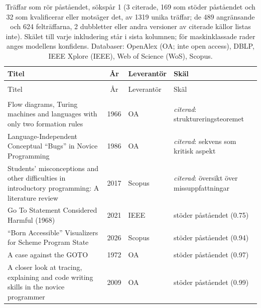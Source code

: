 
\begingroup\footnotesize
\begin{longtable}{@{}%
  >{\raggedright\arraybackslash}p{}c%
  >{\raggedright\arraybackslash}p{}%
  >{\raggedright\arraybackslash}p{}@{}}
\caption{Träffar som rör påståendet, sökspår 1 (3 citerade, 169 som stöder påståendet och 32 som kvalificerar eller motsäger det, av 1319 unika träffar; de 489 angränsande och 624 felträffarna, 2 dubbletter eller andra versioner av citerade källor listas inte). Skälet till varje inkludering står i sista kolumnen; för maskinklassade rader anges modellens konfidens. Databaser: OpenAlex (OA; inte open access), DBLP, IEEE Xplore (IEEE), Web of Science (WoS), Scopus.}\label{tab:sok-B1}\\
\toprule
Titel & År & Leverantör & Skäl \\
\midrule
\endfirsthead
\multicolumn{4}{@{}l}{\emph{\tablename~\thetable{} (\GetTranslation{continued})}}\\
\toprule
Titel & År & Leverantör & Skäl \\
\midrule
\endhead
\midrule \multicolumn{4}{r@{}}{\emph{\GetTranslation{continued on the next page}}}\\
\endfoot
\bottomrule
\endlastfoot
Flow diagrams, Turing machines and languages with only two formation rules & 1966 & OA & \emph{citerad}: struktureringsteoremet \\
Language-Independent Conceptual ``Bugs'' in Novice Programming & 1986 & OA & \emph{citerad}: sekvens som kritisk aspekt \\
Students' misconceptions and other difficulties in introductory programming: A literature review & 2017 & Scopus & \emph{citerad}: översikt över missuppfattningar \\
29 Go To Statement Considered Harmful (1968) & 2021 & IEEE & stöder påståendet (0.75) \\
``Born Accessible'' Visualizers for Scheme Program State & 2026 & Scopus & stöder påståendet (0.94) \\
A case against the GOTO & 1972 & OA & stöder påståendet (0.97) \\
A closer look at tracing, explaining and code writing skills in the novice programmer & 2009 & OA & stöder påståendet (0.99) \\

\end{longtable}
